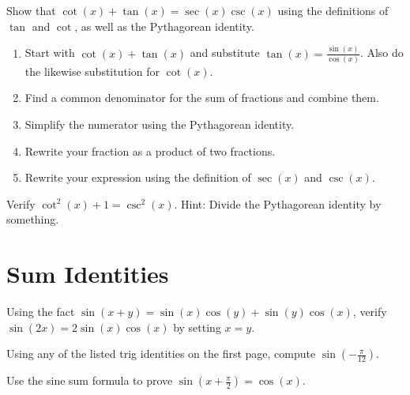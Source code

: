 \documentclass[12pt, a4paper]{article}
\begin{document}
\begin{ex}
  Show that \(\cot(x)+\tan(x) = \sec(x)\csc(x)\) using the definitions
  of \(\tan\) and \(\cot\), as well as the Pythagorean identity.
  \begin{enumerate}
  \item Start with \(\cot(x) + \tan(x)\) and substitute \(\tan(x) =
    \frac{\sin(x)}{\cos(x)}\). Also do the 
    likewise substitution for \(\cot(x)\).
    \vspace{1in}
  \item Find a common denominator for the sum of fractions and combine
    them.
    \vspace{1in}
  \item Simplify the numerator using the Pythagorean identity.
    \vspace{1in}
  \item Rewrite your fraction as a product of two fractions.
    \vspace{1in}
  \item Rewrite your expression using the definition of \(\sec(x)\)
    and \(\csc(x)\).
  \end{enumerate}
\end{ex}
\vspace{-1in}
\begin{ex}
  Verify \(\cot^2(x)+1 = \csc^2(x)\). Hint: Divide the Pythagorean
  identity by something.
\end{ex}
\section{Sum Identities}
\begin{ex}
  Using the fact \(\sin(x+y) = \sin(x)\cos(y)+\sin(y)\cos(x)\), verify
  \(\sin(2x) = 2 \sin(x)\cos(x)\) by setting \(x = y\).
\end{ex}
\begin{ex}
  Using any of the listed trig identities on the first page, compute
  \(\sin\left( -\frac{\pi}{12} \right)\).
\end{ex}
\begin{ex}
  Use the sine sum formula to prove \(\sin\left(x+\frac{\pi}{2}\right) = \cos(x)\).
\end{ex}
\end{document}
